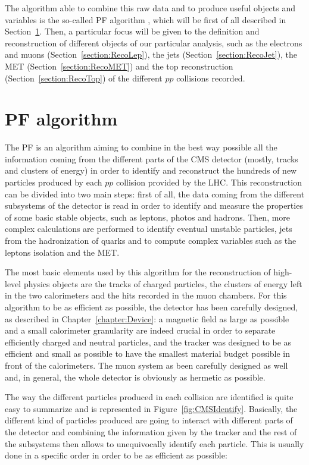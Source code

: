 \documentclass[a4paper, 10pt, openright]{report}
\begin{document}
The algorithm able to combine this raw data and to produce useful objects and variables is the so-called \acf{PF} algorithm \cite{PF}, which will be first of all described in Section~\ref{section:PF}. Then, a particular focus will be given to the definition and reconstruction of different objects of our particular analysis, such as the electrons and muons (Section~\ref{section:RecoLep}), the jets (Section~\ref{section:RecoJet}), the \ac{MET} (Section~\ref{section:RecoMET}) and the top reconstruction (Section~\ref{section:RecoTop}) of the different $pp$ collisions recorded.

\section{\acf{PF} algorithm} \label{section:PF}

The \ac{PF} is an algorithm aiming to combine in the best way possible all the information coming from the different parts of the \ac{CMS} detector (mostly, tracks and clusters of energy) in order to identify and reconstruct the hundreds of new particles produced by each $pp$ collision provided by the \ac{LHC}. This reconstruction can be divided into two main steps: first of all, the data coming from the different subsystems of the detector is read in order to identify and measure the properties of some basic stable objects, such as leptons, photos and hadrons. Then, more complex calculations are performed to identify eventual unstable particles, jets from the hadronization of quarks and to compute complex variables such as the leptons isolation and the \ac{MET}.

The most basic elements used by this algorithm for the reconstruction of high-level physics objects are the tracks of charged particles, the clusters of energy left in the two calorimeters and the hits recorded in the muon chambers. For this algorithm to be as efficient as possible, the detector has been carefully designed, as described in Chapter~\ref{chapter:Device}: a magnetic field as large as possible and a small calorimeter granularity are indeed crucial in order to separate efficiently charged and neutral particles, and the tracker was designed to be as efficient and small as possible to have the smallest material budget possible in front of the calorimeters. The muon system as been carefully designed as well and, in general, the whole detector is obviously as hermetic as possible.

The way the different particles produced in each collision are identified is quite easy to summarize and is represented in Figure~\ref{fig:CMSIdentify}. Basically, the different kind of particles produced are going to interact with different parts of the detector and combining the information given by the tracker and the rest of the subsystems then allows to unequivocally identify each particle. This is usually done in a specific order in order to be as efficient as possible:
\end{document}
